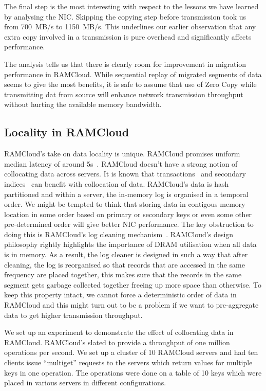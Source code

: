 The final step is the most interesting with respect to the lessons we have learned by analysing the NIC. Skipping the copying step before transmission took us from 700~MB/s to 
1150~MB/s. This underlines our earlier observation that any extra copy involved in a transmission is pure overhead and significantly affects performance. 

The analysis tells us that there is clearly room for improvement in migration performance in RAMCloud. While sequential replay of migrated segments of data seems to give the most benefits, 
it is safe to assume that use of Zero Copy while transmitting dat from source will enhance network transmission throughput without hurting the available memory bandwidth.


\subsection{Locality in RAMCloud}
RAMCloud's take on data locality is unique. RAMCloud promises uniform median latency of around 5\textmu s~\cite{ramcloud}. RAMCloud doesn't have a strong notion of collocating data across servers. 
It is known that transactions~\cite{ramcloudtx} and secondary indices~\cite{slik} can benefit with collocation of data. RAMCloud's data is hash partitioned and within a server, the in-memory log is organised 
in a temporal order. We might be tempted to think that storing data in contigous memory location in some order based on primary or secondary keys or even some other pre-determined order will give better NIC performance. 
The key obstruction to doing this is RAMCloud's log cleaning mechanism~\cite{ramcloudfast}. RAMCloud's design philosophy rightly highlights the importance of DRAM utilisation when all data is in memory. 
As a result, the log cleaner is designed in such a way that after cleaning, the log is reorganised so that records that are accessed in the same frequency are placed together, this makes sure that the records in the same 
segment gets garbage collected together freeing up more space than otherwise. To keep this property intact, we cannot force a deterministic order of data in RAMCloud and this might turn out to be a problem if 
we want to pre-aggregate data to get higher transmission throughput.

We set up an experiment to demonstrate the effect of collocating data in RAMCloud. RAMCloud's slated to provide a throughput of one million operations per second. We set up a cluster of 10 RAMCloud servers 
and had ten clients issue ``multiget'' requests to the servers which return values for multiple keys in one operation. The operations were done on a table of 10 keys which were placed in various servers in different 
configurations. 

